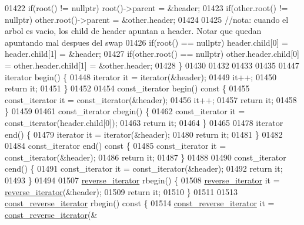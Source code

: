 \begin{DoxyCode}
01422         \textcolor{keywordflow}{if}(root() != \textcolor{keyword}{nullptr}) root()->parent = &header;
01423         \textcolor{keywordflow}{if}(other.root() != \textcolor{keyword}{nullptr}) other.root()->parent = &other.header;
01424 
01425         \textcolor{comment}{//nota: cuando el arbol es vacio, los child de header apuntan a header.  Notar que quedan apuntando
       mal despues del swap}
01426         \textcolor{keywordflow}{if}(root() == \textcolor{keyword}{nullptr}) header.child[0] = header.child[1] = &header;
01427         \textcolor{keywordflow}{if}(other.root() == \textcolor{keyword}{nullptr}) other.header.child[0] = other.header.child[1] = &other.header;
01428     \}
01430 
01432 
01433 
01435 
01447     iterator begin() \{
01448         iterator it = iterator(&header);
01449         it++;
01450         \textcolor{keywordflow}{return} it;
01451     \}
01452 
01454     const\_iterator begin()\textcolor{keyword}{ const }\{
01455         const\_iterator it = const\_iterator(&header);
01456         it++;
01457         \textcolor{keywordflow}{return} it;
01458     \}
01459 
01461     const\_iterator cbegin() \{
01462         const\_iterator it = const\_iterator(header.child[0]);
01463         \textcolor{keywordflow}{return} it;
01464     \}
01465 
01478     iterator end() \{
01479         iterator it = iterator(&header);
01480         \textcolor{keywordflow}{return} it;
01481     \}
01482 
01484     const\_iterator end()\textcolor{keyword}{ const }\{
01485         const\_iterator it = const\_iterator(&header);
01486         \textcolor{keywordflow}{return} it;
01487     \}
01488 
01490     const\_iterator cend() \{
01491         const\_iterator it = const\_iterator(&header);
01492         \textcolor{keywordflow}{return} it;
01493     \}
01494 
01507     \hyperlink{classaed2_1_1map_a8e6a592062260177fd73b2f9897b1dd5_a8e6a592062260177fd73b2f9897b1dd5}{reverse\_iterator} rbegin() \{
01508         \hyperlink{classaed2_1_1map_a8e6a592062260177fd73b2f9897b1dd5_a8e6a592062260177fd73b2f9897b1dd5}{reverse\_iterator} it = \hyperlink{classaed2_1_1map_a8e6a592062260177fd73b2f9897b1dd5_a8e6a592062260177fd73b2f9897b1dd5}{reverse\_iterator}(&header);
01509         \textcolor{keywordflow}{return} it;
01510     \}
01511 
01513     \hyperlink{classaed2_1_1map_aed66a216549d13078a3ea6978ea0b768_aed66a216549d13078a3ea6978ea0b768}{const\_reverse\_iterator} rbegin()\textcolor{keyword}{ const }\{
01514         \hyperlink{classaed2_1_1map_aed66a216549d13078a3ea6978ea0b768_aed66a216549d13078a3ea6978ea0b768}{const\_reverse\_iterator} it = \hyperlink{classaed2_1_1map_aed66a216549d13078a3ea6978ea0b768_aed66a216549d13078a3ea6978ea0b768}{const\_reverse\_iterator}(&

\end{DoxyCode}
